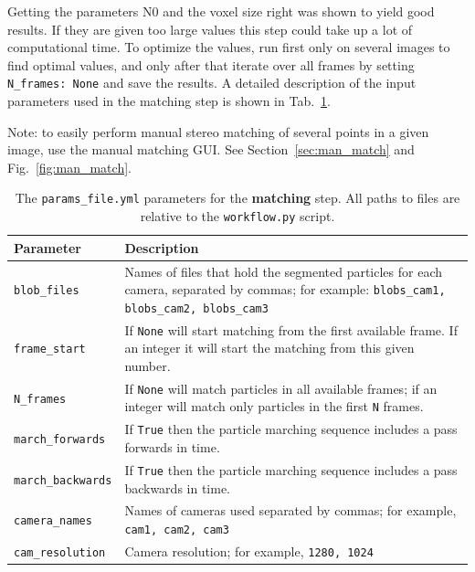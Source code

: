 \documentclass[10pt,a4paper]{article}
\begin{document}
Getting the parameters N0 and the voxel size right was shown to yield good results. If they are given too large values this step could take up a lot of computational time. To optimize the values, run first only on several images to find optimal values, and only after that iterate over all frames by setting \texttt{N\_frames: None} and save the results. 
A detailed description of the input parameters used in the matching step is shown in Tab.~\ref{tab:matching}.


Note: to easily perform manual stereo matching of several points in a given image, use the manual matching GUI. See Section~\ref{sec:man_match} and Fig.~\ref{fig:man_match}.


\begin{table}[!ht]
	\centering
	\caption{The \texttt{params\_file.yml} parameters for the \textbf{matching} step. All paths to files are relative to the \texttt{workflow.py} script.}
	\label{tab:matching}
	\begin{tabular}{l m{13cm}}
		\hline
		Parameter & Description\\[.1cm]
		\hline
		
		\texttt{blob\_files} & Names of files that hold the segmented particles for each camera, separated by commas; for example: \texttt{blobs\_cam1, blobs\_cam2, blobs\_cam3} \\[.1cm]
		
		\texttt{frame\_start} & If \texttt{None} will start matching from the first available frame. If an integer it will start the matching from this given number. \\[.1cm]
		
		\texttt{N\_frames} & If \texttt{None} will match particles in all available frames; if an integer will match only particles in the first \texttt{N} frames. \\[.1cm]
		
		\texttt{march\_forwards} & If \texttt{True} then the particle marching sequence includes a pass forwards in time. \\[.1cm]
		
		\texttt{march\_backwards} & If \texttt{True} then the particle marching sequence includes a pass backwards in time. \\[.1cm]
		
		\texttt{camera\_names} & Names of cameras used separated by commas; for example, \texttt{cam1, cam2, cam3} \\[.1cm]
		
		\texttt{cam\_resolution} & Camera resolution; for example, \texttt{1280, 1024} \\[.1cm]
		

\end{tabular}
\end{table}
\end{document}
